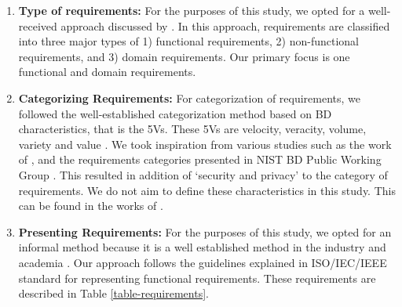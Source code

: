 \documentclass[a4paper,11pt,article,oneside]{memoir}
\begin{document}
\begin{enumerate}
    \item \textbf{Type of requirements:} For the purposes of this study, we opted for a well-received approach discussed by \citet{laplante2017requirements}. In this approach, requirements are classified into three major types of 1) functional requirements, 2) non-functional requirements, and 3) domain requirements. Our primary focus is one functional and domain requirements. 
    \item \textbf{Categorizing Requirements:} For categorization of requirements, we followed the well-established categorization method based on BD characteristics, that is the 5Vs. These 5Vs are velocity, veracity, volume, variety and value \citep{rad2017big}. We took inspiration from various studies such as the work of \citet{nadal2017software}, and the requirements categories presented in NIST BD Public Working Group \citep{Chang.2019}. This resulted in addition of `security and privacy' to the category of requirements. We do not aim to define these characteristics in this study. This can be found in the works of \citet{rada2017hype}.
    \item \textbf{Presenting Requirements:} For the purposes of this study, we opted for an informal method because it is a well established method in the industry and academia \citep{kassab2014state}. Our approach follows the guidelines explained in ISO/IEC/IEEE standard \citet{ISO29148} for representing functional requirements. These requirements are described in Table \ref{table-requirements}.

\end{enumerate}



\end{document}
